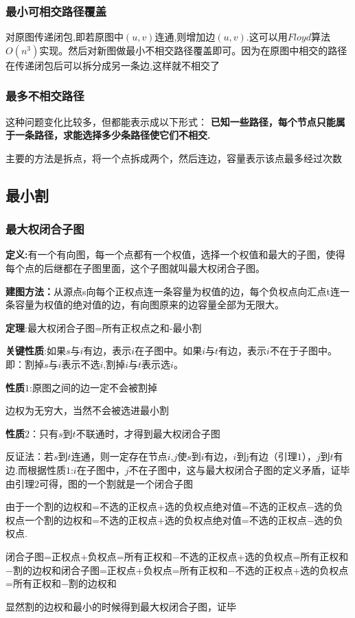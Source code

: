 \documentclass[12pt, a4paper, oneside]{ctexart}
\begin{document}
\subsubsection{最小可相交路径覆盖}
对原图传递闭包,即若原图中$(u,v)$连通,则增加边$(u,v)$.这可以用$Floyd$算法$O(n^{3})$实现。然后对新图做最小不相交路径覆盖即可。因为在原图中相交的路径在传递闭包后可以拆分成另一条边,这样就不相交了

\subsubsection{最多不相交路径} 
这种问题变化比较多，但都能表示成以下形式：
\textbf{已知一些路径，每个节点只能属于一条路径，求能选择多少条路径使它们不相交.}\par
主要的方法是拆点，将一个点拆成两个，然后连边，容量表示该点最多经过次数


\subsection{最小割}
\subsubsection{最大权闭合子图}
\textbf{定义:}有一个有向图，每一个点都有一个权值，选择一个权值和最大的子图，使得每个点的后继都在子图里面，这个子图就叫最大权闭合子图。\par
\textbf{建图方法：}从源点s向每个正权点连一条容量为权值的边，每个负权点向汇点t连一条容量为权值的绝对值的边，有向图原来的边容量全部为无限大。\par
\textbf{定理}:最大权闭合子图=所有正权点之和-最小割\par
\textbf{关键性质}:如果$s$与$i$有边，表示$i$在子图中。如果$i$与$t$有边，表示$i$不在于子图中。即：割掉$s$与$i$表示不选$i$,割掉$i$与$t$表示选$i$。\par
\textbf{性质$1$}:原图之间的边一定不会被割掉\par
 边权为无穷大，当然不会被选进最小割\par
\textbf{性质$2$}：只有$s$到$t$不联通时，才得到最大权闭合子图\par
 反证法：若$s$到$t$连通，则一定存在节点$i$,$j$使$s$到$i$有边，$i$到j有边（引理$1$），$j$到$t$有边.而根据性质$1$:$i$在子图中，$j$不在子图中，这与最大权闭合子图的定义矛盾，证毕
由引理$2$可得，图的一个割就是一个闭合子图\par
由于一个割的边权和=不选的正权点+选的负权点绝对值=不选的正权点−选的负权点一个割的边权和=不选的正权点+选的负权点绝对值=不选的正权点−选的负权点.\par
闭合子图=正权点+负权点=所有正权和−不选的正权点+选的负权点=所有正权和−割的边权和闭合子图=正权点+负权点=所有正权和−不选的正权点+选的负权点=所有正权和−割的边权和\par
显然割的边权和最小的时候得到最大权闭合子图，证毕
\end{document}
